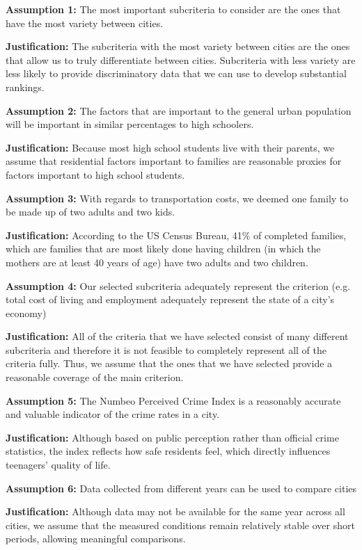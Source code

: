\documentclass[11pt,letterpaper]{article}
\begin{document}
\par\noindent\textbf{Assumption 1:} The most important subcriteria to consider are the ones that have the most 
variety between cities. 
\par\noindent\textbf{Justification:} The subcriteria with the most variety between cities are the ones that allow us to 
truly differentiate between cities. Subcriteria with less variety are less likely to provide 
discriminatory data that we can use to develop substantial rankings. 
\medskip
\par\noindent\textbf{Assumption 2:} The factors that are important to the general urban population will be important 
in similar percentages to high schoolers. 
\par\noindent\textbf{Justification:} Because most high school students live with their parents, we assume that 
residential factors important to families are reasonable proxies for factors important to high 
school students. 
\medskip
\par\noindent\textbf{Assumption 3:} With regards to transportation costs, we deemed one family to be made up of two 
adults and two kids. 
\par\noindent\textbf{Justification:} According to the US Census Bureau, 41\% of completed families, which are 
families that are most likely done having children (in which the mothers are at least 40 years of 
age) have two adults and two children. 
\medskip
\par\noindent\textbf{Assumption 4:} Our selected subcriteria adequately represent the criterion (e.g. total cost of 
living and employment adequately represent the state of a city's economy) 
\par\noindent\textbf{Justification:} All of the criteria that we have selected consist of many different subcriteria and 
therefore it is not feasible to completely represent all of the criteria fully. Thus, we assume that 
the ones that we have selected provide a reasonable coverage of the main criterion.  
\medskip
\par\noindent\textbf{Assumption 5:} The Numbeo Perceived Crime Index is a reasonably accurate and valuable 
indicator of the crime rates in a city. 
\par\noindent\textbf{Justification:} Although based on public perception rather than official crime statistics, the index 
reflects how safe residents feel, which directly influences teenagers' quality of life. 
\medskip
\par\noindent\textbf{Assumption 6:} Data collected from different years can be used to compare cities 
\par\noindent\textbf{Justification:} Although data may not be available for the same year across all cities, we assume 
that the measured conditions remain relatively stable over short periods, allowing meaningful 
comparisons.
\end{document}
